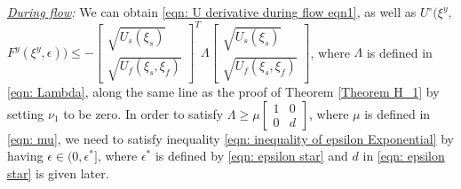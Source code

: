 \noindent\emph{\underline{During flow}:} 
We can obtain \eqref{eqn: U derivative during flow eqn1}, as well as
$
U^\circ(\xi^y, 
$
$
F^y(\xi^y, \epsilon)) \leq - 
\left[ \begin{smallmatrix}
            \sqrt{U_s(\xi_s)} \\ \sqrt{U_f(\xi_s, \xi_f)}
        \end{smallmatrix} \right]^T
        \Lambda
        \left[ \begin{smallmatrix}
            \sqrt{U_s(\xi_s)} \\ \sqrt{U_f(\xi_s, \xi_f)}
        \end{smallmatrix} \right]
$,
where $\Lambda$ is defined in \eqref{eqn: Lambda}, along the same line as the proof of Theorem \ref{Theorem H_1} by setting $\nu_1$ to be zero.
In order to satisfy $\Lambda \geq \mu
    \left[ \begin{smallmatrix}
        1 & 0 \\ 0 & d
    \end{smallmatrix} \right]$, where $\mu$ is defined in \eqref{eqn: mu}, we need to satisfy inequality \eqref{eqn: inequality of epsilon Exponential} by having $\epsilon \in (0,\epsilon^*]$, where $\epsilon^*$ is defined by \eqref{eqn: epsilon star} and $d$ in \eqref{eqn: epsilon star} is given later.

